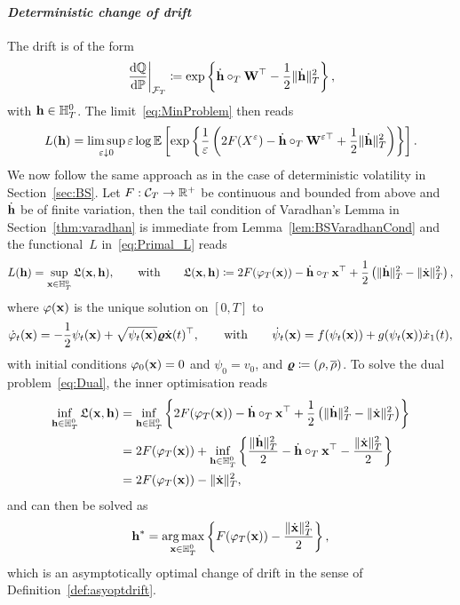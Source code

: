 \paragraph{\textit{Deterministic change of drift}}
The drift is of the form
$$ 
\left.\frac{\D\QQ}{\D\PP}\right|_{\Ff_T} \defEqual \exp\left\{\dot{\hh}\cT \Wf^\top - \frac{1}{2}\|\dot{\hh}\|_{T}^2\right\},
$$
with $\hh\in \HH_T^0$.
The limit~\eqref{eq:MinProblem} %
then reads
$$
L(\hh) = \limsup_{\eps\downarrow 0}
\eps\log\EE\left[
\exp\left\{\frac{1}{\eps}\left(2F(X^{\eps}) - \dot{\hh}\cT \Wf^{\eps\top} + \frac{1}{2}\|\dot{\hh}\|_{T}^2\right)\right\}
\right] .
$$
We now follow the same approach as in the case of deterministic volatility in Section~\ref{sec:BS}. 
Let $F:\Cc_T\rightarrow\RR^+$ be continuous and bounded from above and~$\dot{\hh}$ be of finite variation, then the tail condition of Varadhan's Lemma in Section~\ref{thm:varadhan} is immediate from Lemma~\ref{lem:BSVaradhanCond} and 
the functional~$L$ in~\eqref{eq:Primal_L} reads
$$
L(\hh) = \sup\limits_{\xx\in \HH_T^0}
\Lf(\xx,\hh),
\qquad\text{with}\qquad
\Lf(\xx,\hh) \defEqual 2 F(\varphi_T(\xx)) - \dot{\hh}\cT \xx^\top
 + \half\left(\|\dot{\hh}\|_{T}^2 - \|\dot{\xx}\|_{T}^2\right),
 $$
where $\varphi(\xx)$ is the unique solution on $[0,T]$ to
$$
\dot{\varphi}_t(\xx) = -\frac{1}{2}\psi_t(\xx) + \sqrt{\psi_t(\xx)}\vrho\dot{\xx}(t)^\top,
\qquad\text{with}\qquad
\dot{\psi}_t(\xx) = f(\psi_t(\xx)) + g(\psi_t(\xx)) \dot{x}_1(t), %
$$
with initial conditions $\varphi_0(\xx) = 0$ and $\psi_0 = v_0$, and $\vrho\defEqual(\rho, \brho)$. 
To solve the dual problem~\eqref{eq:Dual}, the inner optimisation reads
\begin{align*}
\inf_{\hh\in\HH_T^0}\Lf(\xx,\hh) &= \inf_{\hh\in\HH_T^0} \left\{2F(\varphi_T(\xx)) - \dot{\hh}\cT \xx^\top
 + \half\left(\|\dot{\hh}\|_{T}^2 - \|\dot{\xx}\|_{T}^2\right)\right\} \\
&= 2F(\varphi_T(\xx)) + \inf_{\hh\in\HH_T^0}\left\{\frac{\|\dot{\hh}\|_{T}^2}{2} -\dot{\hh}\cT \xx^\top - \frac{\|\dot{\xx}\|_{T}^2}{2}\right\} \\
&= 2F(\varphi_T(\xx)) - \|\dot{\xx}\|_{T}^2,
\end{align*}
and can then be solved as 
\begin{equation}\label{eq:detoptdrift_dual}
\hh^* = \argmax\limits_{\xx\in \HH_T^0} 
\left\{F(\varphi_T(\xx)) - \frac{\|\dot{\xx}\|_{T}^2}{2}\right\},
\end{equation}
which is an asymptotically optimal change of drift in the sense of Definition~\ref{def:asyoptdrift}.\\

